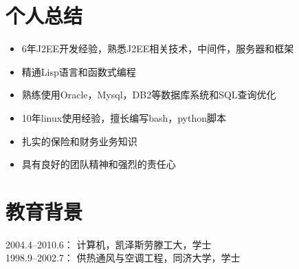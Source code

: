 \documentclass{res}
\begin{document}
 

\begin{CJK}{UTF8}{song}


  \address{  \\东陆路1350弄21号501室\\201206 上海 中国\\0086-18101890138\\klose911@googlemail.com}

  \begin{resume}

    \section{个人总结}
    \begin{itemize}
    \item 6年J2EE开发经验，熟悉J2EE相关技术，中间件，服务器和框架
    \item 精通Lisp语言和函数式编程
    \item 熟练使用Oracle，Mysql，DB2等数据库系统和SQL查询优化
    \item 10年linux使用经验，擅长编写bash，python脚本
    \item 扎实的保险和财务业务知识
    \item 具有良好的团队精神和强烈的责任心
    \end{itemize}


    \section{教育背景}          
    2004.4--2010.6：   \hfill 计算机，凯泽斯劳滕工大，学士 \\
    1998.9--2002.7： \hfill 供热通风与空调工程，同济大学，学士



\end{resume}
\end{CJK}
\end{document}
